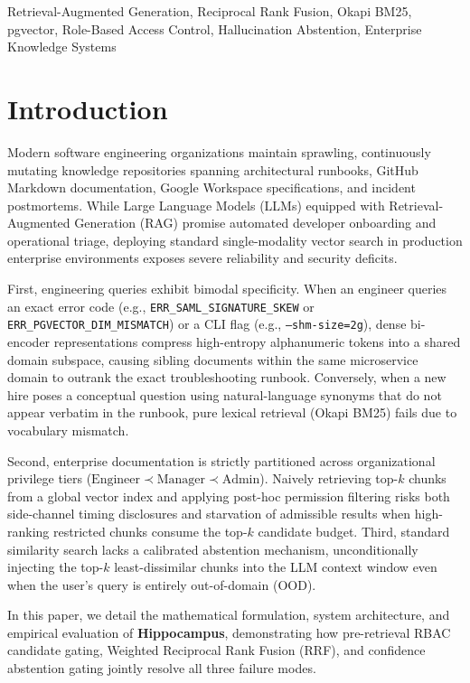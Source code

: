 \documentclass[conference]{IEEEtran}
\begin{document}
\begin{IEEEkeywords}
Retrieval-Augmented Generation, Reciprocal Rank Fusion, Okapi BM25, pgvector, Role-Based Access Control, Hallucination Abstention, Enterprise Knowledge Systems
\end{IEEEkeywords}

\section{Introduction}
Modern software engineering organizations maintain sprawling, continuously mutating knowledge repositories spanning architectural runbooks, GitHub Markdown documentation, Google Workspace specifications, and incident postmortems. While Large Language Models (LLMs) equipped with Retrieval-Augmented Generation (RAG) promise automated developer onboarding and operational triage, deploying standard single-modality vector search in production enterprise environments exposes severe reliability and security deficits.

First, engineering queries exhibit bimodal specificity. When an engineer queries an exact error code (e.g., \texttt{ERR\_SAML\_SIGNATURE\_SKEW} or \texttt{ERR\_PGVECTOR\_DIM\_MISMATCH}) or a CLI flag (e.g., \texttt{--shm-size=2g}), dense bi-encoder representations compress high-entropy alphanumeric tokens into a shared domain subspace, causing sibling documents within the same microservice domain to outrank the exact troubleshooting runbook. Conversely, when a new hire poses a conceptual question using natural-language synonyms that do not appear verbatim in the runbook, pure lexical retrieval (Okapi BM25) fails due to vocabulary mismatch.

Second, enterprise documentation is strictly partitioned across organizational privilege tiers ($\text{Engineer} \prec \text{Manager} \prec \text{Admin}$). Naively retrieving top-$k$ chunks from a global vector index and applying post-hoc permission filtering risks both side-channel timing disclosures and starvation of admissible results when high-ranking restricted chunks consume the top-$k$ candidate budget. Third, standard similarity search lacks a calibrated abstention mechanism, unconditionally injecting the top-$k$ least-dissimilar chunks into the LLM context window even when the user's query is entirely out-of-domain (OOD).

In this paper, we detail the mathematical formulation, system architecture, and empirical evaluation of \textbf{Hippocampus}, demonstrating how pre-retrieval RBAC candidate gating, Weighted Reciprocal Rank Fusion (RRF), and confidence abstention gating jointly resolve all three failure modes.
\end{document}

